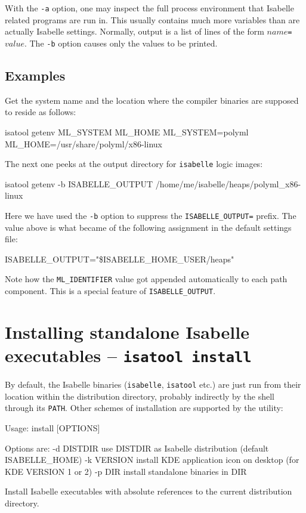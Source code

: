 With the \texttt{-a} option, one may inspect the full process environment that
Isabelle related programs are run in. This usually contains much more
variables than are actually Isabelle settings.  Normally, output is a list of
lines of the form \mbox{$name$\texttt{=}$value$}. The \texttt{-b} option
causes only the values to be printed.


\subsection*{Examples}

Get the {\ML} system name and the location where the compiler binaries are
supposed to reside as follows:
\begin{ttbox}
isatool getenv ML_SYSTEM ML_HOME
{\out ML_SYSTEM=polyml}
{\out ML_HOME=/usr/share/polyml/x86-linux}
\end{ttbox}

The next one peeks at the output directory for \texttt{isabelle} logic images:
\begin{ttbox}
isatool getenv -b ISABELLE_OUTPUT
{\out /home/me/isabelle/heaps/polyml_x86-linux}
\end{ttbox}
Here we have used the \texttt{-b} option to suppress the
\texttt{ISABELLE_OUTPUT=} prefix.  The value above is what became of the
following assignment in the default settings file:
\begin{ttbox}
ISABELLE_OUTPUT="\$ISABELLE_HOME_USER/heaps"
\end{ttbox}
Note how the \texttt{ML_IDENTIFIER} value got appended automatically to each
path component. This is a special feature of \texttt{ISABELLE_OUTPUT}.


\section{Installing standalone Isabelle executables -- \texttt{isatool install}}
\label{sec:tool-install}

By default, the Isabelle binaries (\texttt{isabelle}, \texttt{isatool} etc.)
are just run from their location within the distribution directory, probably
indirectly by the shell through its \texttt{PATH}.  Other schemes of
installation are supported by the  utility:
\begin{ttbox}
Usage: install [OPTIONS]

  Options are:
    -d DISTDIR   use DISTDIR as Isabelle distribution
                 (default ISABELLE_HOME)
    -k VERSION   install KDE application icon on desktop
                 (for KDE VERSION 1 or 2)                                       
    -p DIR       install standalone binaries in DIR

  Install Isabelle executables with absolute references to the current
  distribution directory.
\end{ttbox}

